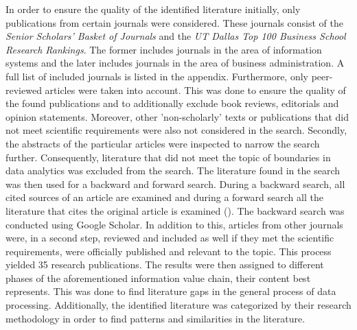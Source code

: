 In order to ensure the quality of the identified literature initially, only publications from certain journals were considered. These journals consist of the \textit{Senior Scholars' Basket of Journals} and the \textit{UT Dallas Top 100 Business School Research Rankings}. The former includes journals in the area of information systems and the later includes journals in the area of business administration. A full list of included journals is listed in the appendix. Furthermore, only peer-reviewed articles were taken into account. This was done to ensure the quality of the found publications and to additionally exclude book reviews, editorials and opinion statements. Moreover, other 'non-scholarly' texts or publications that did not meet scientific requirements were also not considered in the search. Secondly, the abstracts of the particular articles were inspected to narrow the search further. Consequently, literature that did not meet the topic of boundaries in data analytics was excluded from the search. %
The literature found in the search was then used for a backward and forward search. During a backward search, all cited sources of an article are examined and during a forward search all the literature that cites the original article is examined (\cite{Webster.2002}). The backward search was conducted using Google Scholar. In addition to this, articles from other journals were, in a second step, reviewed and included as well if they met the scientific requirements, were officially published and relevant to the topic. This process yielded 35 research publications. The results were then assigned to different phases of the aforementioned information value chain, their content best represents. This was done to find literature gaps in the general process of data processing. Additionally, the identified literature was categorized by their research methodology in order to find patterns and similarities in the literature. %



